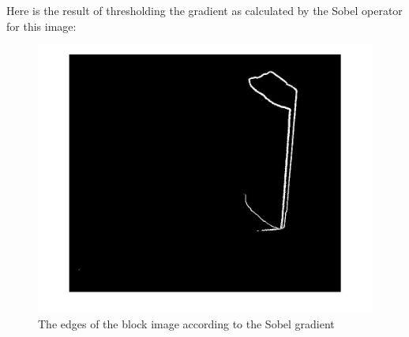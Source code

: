 \documentclass{article}
\begin{document}
Here is the result of thresholding the gradient as calculated by the Sobel operator for this image:
\begin{figure}[H]
  \centering
  \includegraphics[scale=0.3]{Images/block/sobel_block.jpg}
  \caption{The edges of the block image according to the Sobel gradient}
  \label{block_sobel}
\end{figure}
\end{document}
